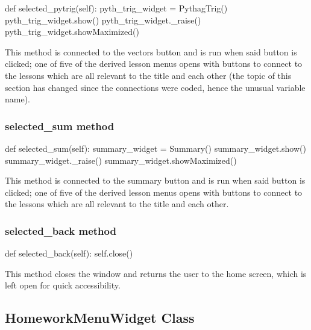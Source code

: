 \begin{python}
def selected_pytrig(self):
        pyth_trig_widget = PythagTrig()
        pyth_trig_widget.show()
        pyth_trig_widget._raise()
        pyth_trig_widget.showMaximized()
\end{python}

This method is connected to the vectors button and is run when said button is clicked; one of five of the derived lesson menus opens with buttons to connect to the lessons which are all relevant to the title and each other (the topic of this section has changed since the connections were coded, hence the unusual variable name).

\subsubsection{selected\_sum method}

\begin{python}
def selected_sum(self):
        summary_widget = Summary()
        summary_widget.show()
        summary_widget._raise()
        summary_widget.showMaximized()
\end{python}

This method is connected to the summary button and is run when said button is clicked; one of five of the derived lesson menus opens with buttons to connect to the lessons which are all relevant to the title and each other.

\subsubsection{selected\_back method}

\begin{python}
def selected_back(self):
        self.close()
\end{python}

This method closes the window and returns the user to the home screen, which is left open for quick accessibility.

\subsection{HomeworkMenuWidget Class}

